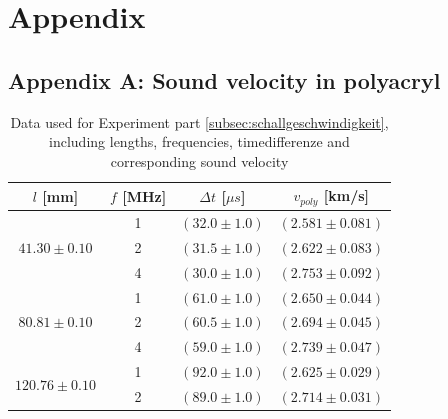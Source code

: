 \section{Appendix}

\subsection{Appendix A: Sound velocity in polyacryl} \label{subsec:AppendixA}
\begin{table}[H]
\begin{tabular}{|c|c|c|c|}
\hline
$l$ [mm] & $f$ [MHz] & $\Delta t$ [$\mu s$] & $v_{poly}$ [km/s] \\
\hline

\multirow{3}{*}{$41.30 \pm 0.10$} 
& 1 & $(32.0 \pm 1.0)$ & $(2.581 \pm 0.081)$ \\
\cline{2-4}
& 2 & $(31.5 \pm 1.0)$ & $(2.622 \pm 0.083)$ \\
\cline{2-4}
& 4 & $(30.0 \pm 1.0)$ & $(2.753 \pm 0.092)$ \\
\hline

\multirow{3}{*}{$80.81 \pm 0.10$} 
& 1 & $(61.0 \pm 1.0)$ & $(2.650 \pm 0.044)$ \\
\cline{2-4}
& 2 & $(60.5 \pm 1.0)$ & $(2.694 \pm 0.045)$ \\
\cline{2-4}
& 4 & $(59.0 \pm 1.0)$ & $(2.739 \pm 0.047)$ \\
\hline

\multirow{2}{*}{$120.76 \pm 0.10$} 
& 1 & $(92.0 \pm 1.0)$ & $(2.625 \pm 0.029)$ \\
\cline{2-4}
& 2 & $(89.0 \pm 1.0)$ & $(2.714 \pm 0.031)$ \\
\hline

\end{tabular}
\caption{Data used for Experiment part \ref{subsec:schallgeschwindigkeit}, including lengths, frequencies, timedifferenze and corresponding sound velocity}
\label{tab:DataSchallgeschwindigkeit}
\end{table}

\newpage


